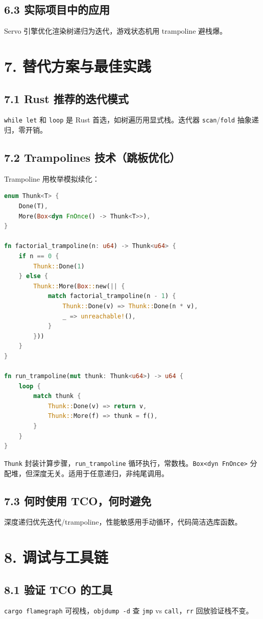 \section{6.3 实际项目中的应用}
Servo 引擎优化渲染树递归为迭代，游戏状态机用 trampoline 避栈爆。\par
\chapter{7. 替代方案与最佳实践}
\section{7.1 Rust 推荐的迭代模式}
\texttt{while let} 和 \texttt{loop} 是 Rust 首选，如树遍历用显式栈。迭代器 \texttt{scan}/\texttt{fold} 抽象递归，零开销。\par
\section{7.2 Trampolines 技术（跳板优化）}
Trampoline 用枚举模拟续化：\par
\begin{lstlisting}[language=rust]
enum Thunk<T> {
    Done(T),
    More(Box<dyn FnOnce() -> Thunk<T>>),
}

fn factorial_trampoline(n: u64) -> Thunk<u64> {
    if n == 0 {
        Thunk::Done(1)
    } else {
        Thunk::More(Box::new(|| {
            match factorial_trampoline(n - 1) {
                Thunk::Done(v) => Thunk::Done(n * v),
                _ => unreachable!(),
            }
        }))
    }
}

fn run_trampoline(mut thunk: Thunk<u64>) -> u64 {
    loop {
        match thunk {
            Thunk::Done(v) => return v,
            Thunk::More(f) => thunk = f(),
        }
    }
}
\end{lstlisting}
\texttt{Thunk} 封装计算步骤，\texttt{run\_{}trampoline} 循环执行，常数栈。\texttt{Box<dyn FnOnce>} 分配堆，但深度无关。适用于任意递归，非纯尾调用。\par
\section{7.3 何时使用 TCO，何时避免}
深度递归优先迭代/trampoline，性能敏感用手动循环，代码简洁选库函数。\par
\chapter{8. 调试与工具链}
\section{8.1 验证 TCO 的工具}
\texttt{cargo flamegraph} 可视栈，\texttt{objdump -d} 查 \texttt{jmp} vs \texttt{call}，\texttt{rr} 回放验证栈不变。\par
